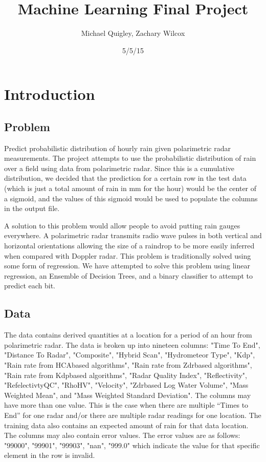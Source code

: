 \documentclass[pdftex,a4paper,11pt]{article}
\title{Machine Learning Final Project}
\author{Michael Quigley, Zachary Wilcox}
\date{5/5/15}
\begin{document}
\maketitle
\section{Introduction}
\subsection{Problem}
Predict probabilistic distribution of hourly rain given polarimetric radar measurements.
The project attempts to use the probabilistic distribution of rain over a field using data from
polarimetric radar. Since this is a cumulative distribution, we decided that the prediction for a certain row in the test data (which is just a total amount of rain in mm for the hour) would be the center of a sigmoid, and the values of this sigmoid would be used to populate the columns in the output file. 

A solution to this problem would allow people to avoid putting rain gauges everywhere. A polarimetric
radar transmits radio wave pulses in both vertical and horizontal orientations allowing the size
of a raindrop to be more easily inferred when compared with Doppler radar.
This problem is traditionally solved using some form of regression.  We have attempted to solve this problem using linear regression, an Ensemble of Decision Trees, and a binary classifier to attempt to predict each bit.

\subsection{Data}
The data contains derived quantities at a location for a period of an hour from polarimetric
radar. The data is broken up into nineteen columns: "Time To End", "Distance To Radar",
"Composite", "Hybrid Scan", "Hydrometeor Type", "Kdp", "Rain rate from HCAbased
algorithms", "Rain rate from Zdrbased
algorithms", "Rain rate from Kdpbased
algorithms",
"Radar Quality Index", "Reflectivity", "RefelectivtyQC", "RhoHV", "Velocity", "Zdrbased
Log
Water Volume", "Mass Weighted Mean", and "Mass Weighted Standard Deviation".
The columns may have more than one value. This is the case when there are multiple “Times
to End” for one radar and/or there are multiple radar readings for one location. The training
data also contains an expected amount of rain for that data location. The columns may also
contain error values. The error values are as follows: "99000",
"99901",
"99903",
"nan",
"999.0" which indicate the value for that specific element in the row is invalid.
\end{document}
